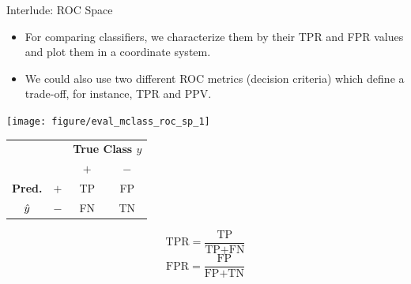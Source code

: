 \begin{vbframe}{Interlude: ROC Space}
	
	\begin{itemize}
		\item For comparing classifiers, we characterize them by their TPR and FPR values and plot them in 
		a coordinate system.
		\item We could also use two different ROC metrics (decision criteria) which define a trade-off, 
		for instance, TPR and PPV.
	\end{itemize}
	
	\lz
	
	\begin{minipage}[c]{0.5\textwidth}
		\begin{knitrout}
			\scriptsize
			\color{fgcolor}
			{\centering \texttt{[image: figure/eval\_mclass\_roc\_sp\_1]}}
		\end{knitrout}
	\end{minipage}%
	\begin{minipage}[c]{0.5\textwidth}
		\begin{center}
			\small
			\begin{tabular}{cc|cc}
				& & \multicolumn{2}{c}{\bfseries True Class $y$} \\
				& & $+$ & $-$ \\
				\hline
				\bfseries Pred.     & $+$ & TP & FP \\
				$\hat{y}$ & $-$ & FN & TN \\
			\end{tabular}
			\lz
			$$\text{TPR} = \frac{\text{TP}}{\text{TP} + \text{FN}}$$
			$$\text{FPR} = \frac{\text{FP}}{\text{FP} + \text{TN}}$$
		\end{center}
	\end{minipage}
	
\end{vbframe}



